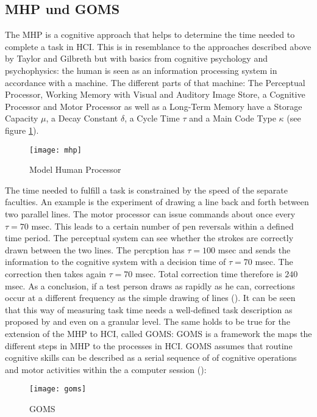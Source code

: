 \subsection{\ac{MHP} und \ac{GOMS}}
The \ac{MHP} is a cognitive approach that helps to determine the time needed to complete a task in \ac{HCI}. This is in resemblance to the approaches described above by Taylor and Gilbreth but with basics from cognitive psychology and psychophysics: the human is seen as an information processing system in accordance with a machine. The different parts of that machine: The Perceptual Processor, Working Memory with Visual and Auditory Image Store, a Cognitive Processor and Motor Processor as well as a Long-Term Memory have a Storage Capacity $\mu$, a Decay Constant $\delta$, a Cycle Time $\tau$ and a Main Code Type $\kappa$ (see figure \ref{fig5}). 

\begin{figure}[ht]
	\centering
  \texttt{[image: mhp]}
	\caption{Model Human Processor}
	\label{fig5}
\end{figure}


The time needed to fulfill a task is constrained by the speed of the separate faculties. An example is the experiment of drawing a line back and forth between two parallel lines. The motor processor can issue commands about once every $\tau=70$ msec. This leads to a certain number of pen reversals within a defined time period. The perceptual system can see whether the strokes are correctly drawn between the two lines. The percption has $\tau=100$ msec and sends the information to the cognitive system with a decision time of $\tau=70$ msec. The correction then takes again $\tau=70$ msec. Total correction time therefore is $240$ msec. As a conclusion, if a test person draws as rapidly as he can, corrections occur at a different frequency as the simple drawing of lines (\cite{card1986model}). It can be seen that this way of measuring task time needs a well-defined task description as proposed by \cite{annett1967task} and even on a granular level. The same holds to be true for the extension of the \ac{MHP} to \ac{HCI}, called \ac{GOMS}: \ac{GOMS} is a framework the maps the different steps in \ac{MHP} to the processes in \ac{HCI}. \ac{GOMS} assumes that routine cognitive skills can be described as a serial sequence of of cognitive operations and motor activities within the a computer session (\cite{olson1990growth}):



\begin{figure}[ht]
	\centering
  \texttt{[image: goms]}
	\caption{GOMS}
	\label{fig6}
\end{figure}

